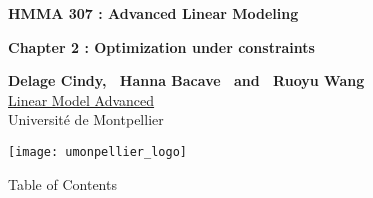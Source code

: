 \documentclass[unknownkeysallowed]{beamer}
\begin{document}



\begin{frame}
\bigskip
\bigskip
\begin{center}{
\LARGE\color{marron}
\textbf{HMMA 307 : Advanced Linear Modeling}
\textbf{ }\\
\vspace{0.5cm}
}

\color{marron}
\textbf{Chapter 2 : Optimization under constraints}
\end{center}

\vspace{0.25cm}

\begin{center}
\textbf{Delage Cindy, \ Hanna Bacave \ and \ Ruoyu Wang \\}
\faGithub\href{ https://github.com/hannabacave/MLA}{ Linear Model Advanced}
\\
\vspace{0.5cm}
Université de Montpellier \\
\end{center}

\centering
\texttt{[image: umonpellier\_logo]}

\end{frame}






\begin{frame}{Table of Contents}
\tableofcontents[hideallsubsections]
\end{frame}



\end{document}
